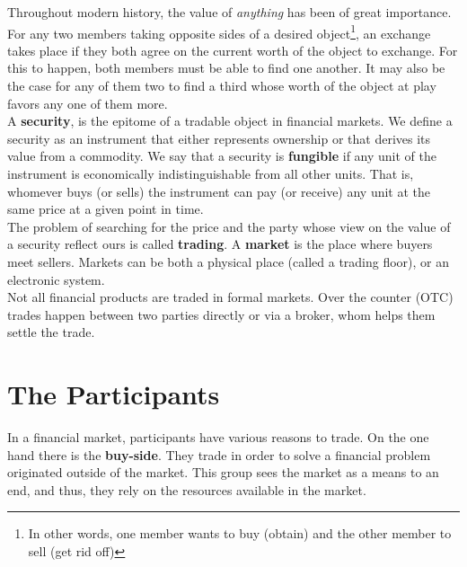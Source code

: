 \documentclass[../TGMAFFIRO]{subfiles}
\begin{document}

Throughout modern history, the value of \textit{anything} has been of great importance. For any two members taking opposite sides of a desired object\footnote{In other words, one member wants to buy (obtain) and the other member to sell (get rid off)}, an exchange takes place if they both agree on the current worth of the object to exchange. For this to happen, both members must be able to find one another. It may also be the case for any of them two to find a third whose worth of the object at play favors any one of them more.\\

A \textbf{security}, is the epitome of a tradable object in financial markets. We define a security as an instrument that either represents ownership or that derives its value from a commodity. We say that a security is \textbf{fungible} if any unit of the instrument is economically indistinguishable from all other units. That is, whomever buys (or sells) the instrument can pay (or receive) any unit at the same price at a given point in time.\\

The problem of searching for the price and the party whose view on the value of a security reflect ours is called \textbf{trading}. A \textbf{market} is the place where buyers meet sellers. Markets can be both a physical place (called a trading floor), or an electronic system.\\

Not all financial products are traded in formal markets. Over the counter (OTC) trades happen between two parties directly or via a broker, whom helps them settle the trade. 

\section{The Participants}
In a financial market, participants have various reasons to trade. On the one hand there is the \textbf{buy-side}. They trade in order to solve a financial problem originated outside of the market. This group sees the market as a means to an end, and thus, they rely on the resources available in the market.\\
\end{document}
